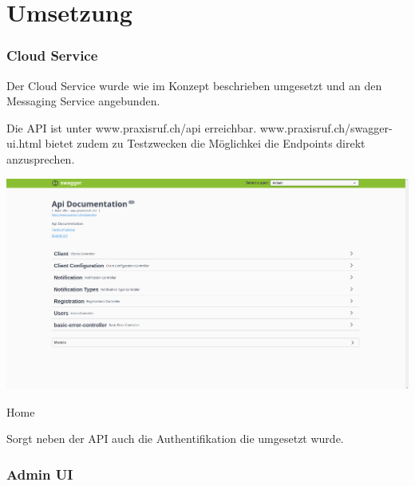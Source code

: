 \section{Umsetzung}\label{sec:umsetzung}






\subsubsection{Cloud Service}

Der Cloud Service wurde wie im Konzept beschrieben umgesetzt und an den Messaging Service angebunden.

Die API ist unter www.praxisruf.ch/api erreichbar.
www.praxisruf.ch/swagger-ui.html bietet zudem zu Testzwecken die Möglichkei die Endpoints direkt anzusprechen.

\begin{minipage}[b]{1\textwidth}
    \includegraphics[width=\textwidth]{graphics/screenshots/cloud/swagger-home}
    \caption{Home}
\end{minipage}

Sorgt neben der API auch die Authentifikation die umgesetzt wurde.

\clearpage

\subsubsection{Admin UI}

